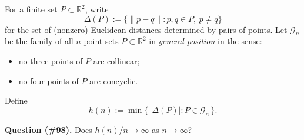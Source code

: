 For a finite set $P\subset\mathbb{R}^2$, write
\[
\Delta(P):=\{\|p-q\|:p,q\in P,\ p\ne q\}
\]
for the set of (nonzero) Euclidean distances determined by pairs of points.
Let $\mathcal{G}_n$ be the family of all $n$-point sets $P\subset\mathbb{R}^2$ in \emph{general position} in the sense:
\begin{itemize}[leftmargin=*]
\item no three points of $P$ are collinear;
\item no four points of $P$ are concyclic.
\end{itemize}
Define
\[
h(n):=\min\{\,|\Delta(P)|: P\in\mathcal{G}_n\,\}.
\]

\medskip
\noindent\textbf{Question (\#98).} Does $h(n)/n\to\infty$ as $n\to\infty$?

\item
